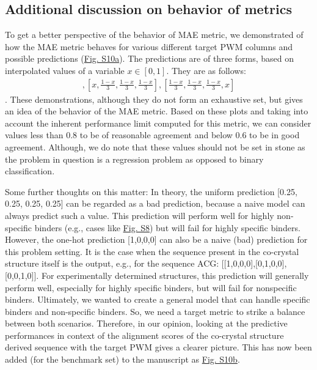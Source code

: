 \subsection{Additional discussion on behavior of metrics}

To get a better perspective of the behavior of MAE metric, we demonstrated of how the MAE metric behaves for various different target PWM columns and possible predictions (\hyperref[fig:pdnaS10]{Fig. S10a}). The predictions are of three forms, based on interpolated values of a variable $x\in[0,1]$. They are as follows: %
\begin{align}
[1-x,0,x,0], [x, \frac{1-x}{3}, \frac{1-x}{3}, \frac{1-x}{3}], [\frac{1-x}{3}, \frac{1-x}{3}, \frac{1-x}{3}, x]
\end{align}
. These demonstrations, although they do not form an exhaustive set, but gives an idea of the behavior of the MAE metric. Based on these plots and taking into account the inherent performance limit computed for this metric, we can consider values less than 0.8 to be of reasonable agreement and below 0.6 to be in good agreement. Although, we do note that these values should not be set in stone as the problem in question is a regression problem as opposed to binary classification.

Some further thoughts on this matter: In theory, the uniform prediction [0.25, 0.25, 0.25, 0.25] can be regarded as a bad prediction, because a naive model can always predict such a value. This prediction will perform well for highly non-specific binders (e.g., cases like \hyperref[fig:pdnaS8]{Fig. S8}) but will fail for highly specific binders. However, the one-hot prediction [1,0,0,0] can also be a naive (bad) prediction for this problem setting. It is the case when the sequence present in the co-crystal structure itself is the output, e.g., for the sequence ACG: [[1,0,0,0],[0,1,0,0],[0,0,1,0]]. For experimentally determined structures, this prediction will generally perform well, especially for highly specific binders, but will fail for nonspecific binders. Ultimately, we wanted to create a general model that can handle specific binders and non-specific binders. So, we need a target metric to strike a balance between both scenarios. Therefore, in our opinion, looking at the predictive performances in context of the alignment scores of the co-crystal structure derived sequence with the target PWM gives a clearer picture. This has now been added (for the benchmark set) to the manuscript as \hyperref[fig:pdnaS10]{Fig. S10b}.

